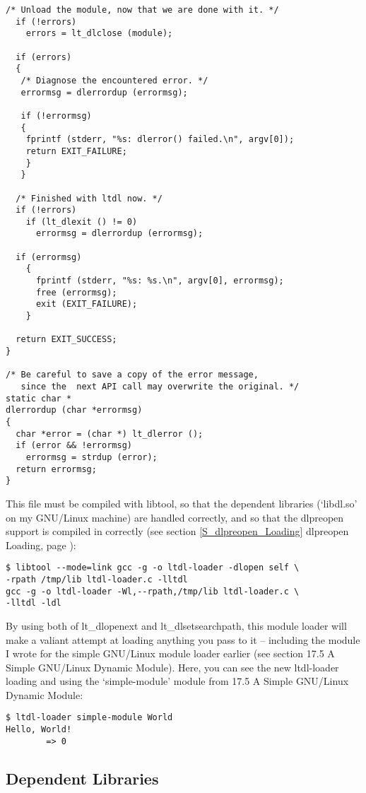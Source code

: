 \begin{Verbatim}[frame=single]
  /* Unload the module, now that we are done with it. */
  if (!errors)
    errors = lt_dlclose (module);

  if (errors)
  {
   /* Diagnose the encountered error. */
   errormsg = dlerrordup (errormsg);

   if (!errormsg)
   {
    fprintf (stderr, "%s: dlerror() failed.\n", argv[0]);
    return EXIT_FAILURE;
    }
   }

  /* Finished with ltdl now. */
  if (!errors)
    if (lt_dlexit () != 0)
      errormsg = dlerrordup (errormsg);

  if (errormsg)
    {
      fprintf (stderr, "%s: %s.\n", argv[0], errormsg);
      free (errormsg);
      exit (EXIT_FAILURE);
    }

  return EXIT_SUCCESS;
}

/* Be careful to save a copy of the error message,
   since the  next API call may overwrite the original. */
static char *
dlerrordup (char *errormsg)
{
  char *error = (char *) lt_dlerror ();
  if (error && !errormsg)
    errormsg = strdup (error);
  return errormsg;
}
\end{Verbatim}

This file must be compiled with libtool, so that the dependent libraries (`libdl.so' on my GNU/Linux machine) are handled correctly, and so that the dlpreopen support is compiled in correctly (see section \ref{S_dlpreopen_Loading}
dlpreopen Loading, page \pageref{S_dlpreopen_Loading}):

\begin{Verbatim}[frame=single]
$ libtool --mode=link gcc -g -o ltdl-loader -dlopen self \
-rpath /tmp/lib ltdl-loader.c -lltdl
gcc -g -o ltdl-loader -Wl,--rpath,/tmp/lib ltdl-loader.c \
-lltdl -ldl
\end{Verbatim}

By using both of lt\_{}dlopenext and lt\_{}dlsetsearchpath, this module loader will make a valiant attempt at loading anything you pass to it -- including the module I wrote for the simple GNU/Linux module loader earlier (see section 17.5 A Simple GNU/Linux Dynamic Module). Here, you can see the new ltdl-loader loading and using the `simple-module' module from 17.5 A Simple GNU/Linux Dynamic Module:

 	
\begin{Verbatim}[frame=single]
$ ltdl-loader simple-module World
Hello, World!
        => 0
\end{Verbatim}



\subsection{Dependent Libraries}

